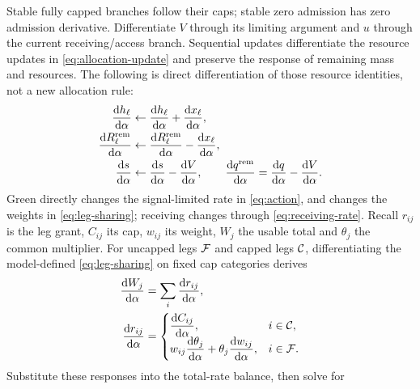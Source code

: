 \documentclass[10pt,a4paper]{article}
\begin{document}
Stable fully capped branches follow their caps; stable zero admission
has zero admission derivative. Differentiate $V$ through its limiting
argument and $u$ through the current receiving/access branch. Sequential
updates differentiate the resource updates in \eqref{eq:allocation-update}
and preserve the response of remaining mass and resources.
The following is direct differentiation of those resource identities, not a new allocation rule:
\begin{equation}
 \begin{aligned}
 \frac{\mathrm dh_\ell}{\mathrm d\alpha}&\leftarrow
  \frac{\mathrm dh_\ell}{\mathrm d\alpha}
                  +\frac{\mathrm dx_\ell}{\mathrm d\alpha},\\
 \frac{\mathrm dR_\ell^{\rm rem}}{\mathrm d\alpha}&\leftarrow
  \frac{\mathrm dR_\ell^{\rm rem}}{\mathrm d\alpha}
                  -\frac{\mathrm dx_\ell}{\mathrm d\alpha},\\
 \frac{\mathrm ds}{\mathrm d\alpha}&\leftarrow
  \frac{\mathrm ds}{\mathrm d\alpha}-\frac{\mathrm dV}{\mathrm d\alpha},
 \qquad
 \frac{\mathrm dq^{\rm rem}}{\mathrm d\alpha}
  =\frac{\mathrm dq}{\mathrm d\alpha}-\frac{\mathrm dV}{\mathrm d\alpha}.
 \end{aligned}
 \label{eq:scan-derivative}
\end{equation}
Green directly changes the signal-limited rate in \eqref{eq:action},
and changes the weights in \eqref{eq:leg-sharing}; receiving changes
through \eqref{eq:receiving-rate}. Recall $r_{ij}$ is the leg grant,
$C_{ij}$ its cap, $w_{ij}$ its weight, $W_j$ the usable total and
$\theta_j$ the common multiplier. For uncapped legs ${\cal F}$ and
capped legs ${\cal C}$,
differentiating the model-defined \eqref{eq:leg-sharing} on fixed cap categories derives
\begin{equation}
 \begin{aligned}
 \frac{\mathrm dW_j}{\mathrm d\alpha}
 &=\sum_i\frac{\mathrm dr_{ij}}{\mathrm d\alpha},\\
 \frac{\mathrm dr_{ij}}{\mathrm d\alpha}
 &=\begin{cases}
 \displaystyle\frac{\mathrm dC_{ij}}{\mathrm d\alpha},&i\in{\cal C},\\
 \displaystyle w_{ij}\frac{\mathrm d\theta_j}{\mathrm d\alpha}
       +\theta_j\frac{\mathrm dw_{ij}}{\mathrm d\alpha},&i\in{\cal F}.
 \end{cases}
 \end{aligned}
 \label{eq:sharing-derivative}
\end{equation}
Substitute these responses into the total-rate balance, then solve for
\end{document}
